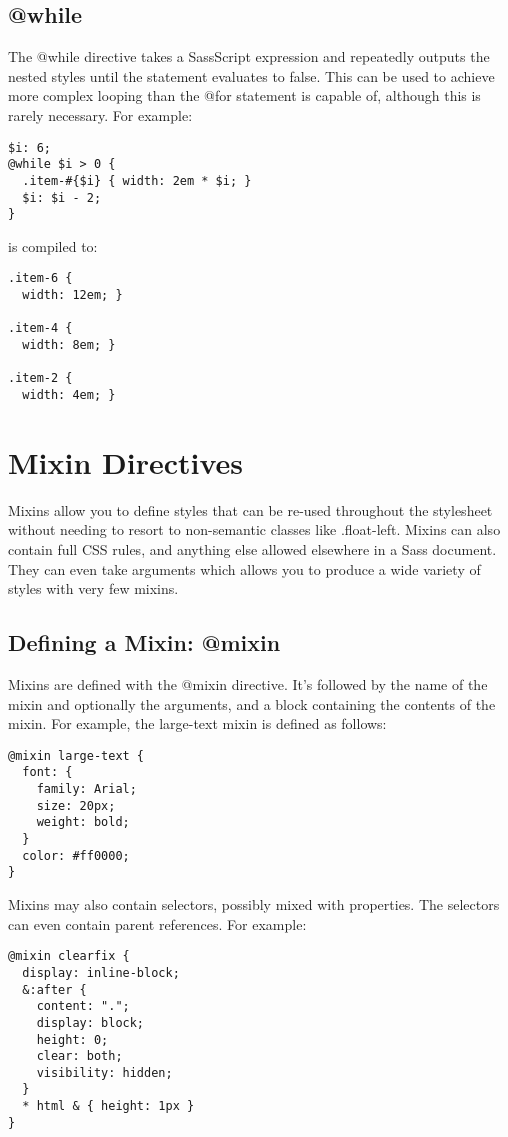 \documentclass[10pt]{article}
\begin{document}
\subsection{@while}


 The @while directive takes a SassScript expression and repeatedly outputs the nested styles until the statement evaluates to false. This can be used to achieve more complex looping than the @for statement is capable of, although this is rarely necessary. For example:
\begin{verbatim}
$i: 6;
@while $i > 0 {
  .item-#{$i} { width: 2em * $i; }
  $i: $i - 2;
}
\end{verbatim}


 is compiled to:
\begin{verbatim}
.item-6 {
  width: 12em; }

.item-4 {
  width: 8em; }

.item-2 {
  width: 4em; }
\end{verbatim}
\section{Mixin Directives}


 Mixins allow you to define styles that can be re-used throughout the stylesheet without needing to resort to non-semantic classes like .float-left. Mixins can also contain full CSS rules, and anything else allowed elsewhere in a Sass document. They can even take arguments which allows you to produce a wide variety of styles with very few mixins.
\subsection{Defining a Mixin: @mixin}


 Mixins are defined with the @mixin directive. It’s followed by the name of the mixin and optionally the arguments, and a block containing the contents of the mixin. For example, the large-text mixin is defined as follows:
\begin{verbatim}
@mixin large-text {
  font: {
    family: Arial;
    size: 20px;
    weight: bold;
  }
  color: #ff0000;
}
\end{verbatim}


 Mixins may also contain selectors, possibly mixed with properties. The selectors can even contain parent references. For example:
\begin{verbatim}
@mixin clearfix {
  display: inline-block;
  &:after {
    content: ".";
    display: block;
    height: 0;
    clear: both;
    visibility: hidden;
  }
  * html & { height: 1px }
}
\end{verbatim}
\end{document}
